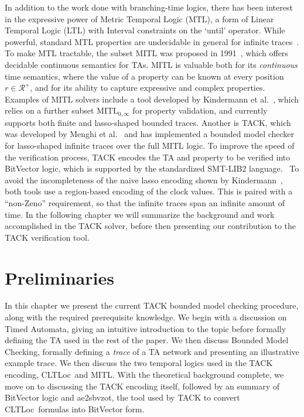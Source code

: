 \documentclass[a4paper,11pt]{report}
\theoremstyle{definition}
\newcommand{\cltloc}{CLTLoc}
\newcommand{\aez}{ae2sbvzot}
\begin{document}
In addition to the work done with branching-time logics, there has been interest
in the expressive power of Metric Temporal Logic (MTL), a form of Linear
Temporal Logic (LTL) with Interval constraints on the `until' operator. While
powerful, standard MTL properties are undecidable in general for infinite
traces~\cite{bouyer09}. To make MTL tractable, the subset MITL was proposed in
1991~\cite{Alur91thebenefits}, which offers decidable continuous semantics for
TAs. MITL is valuable both for its \emph{continuous} time semantics, where the
value of a property can be known at every position $r \in \mathcal{R^{+}}$, and
for its ability to capture expressive and complex properties. Examples of MITL
solvers include a tool developed by Kindermann et al.~\cite{kindermann13}, which
relies on a further subset $\text{MITL}_{0,\infty}$ for property validation, and
currently supports both finite and lasso-shaped bounded traces. Another is TACK,
which was developed by Menghi et al.~\cite{tack20} and has implemented a bounded
model checker for lasso-shaped infinite traces over the full MITL logic. To
improve the speed of the verification process, TACK encodes the TA and property
to be verified into BitVector logic, which is supported by the standardized
SMT-LIB2 language.~\cite{baresi15,baresi16} To avoid the incompleteness of the
naive lasso encoding shown by Kindermann~\cite{kindermann12}, both tools use a
region-based encoding of the clock values. This is paired with a ``non-Zeno''
requirement, so that the infinite traces span an infinite amount of time. In the
following chapter we will summarize the background and work accomplished in the
TACK solver, before then presenting our contribution to the TACK verification
tool.

\chapter{Preliminaries}\label{prelims}

In this chapter we present the current TACK bounded model checking procedure,
along with the required prerequisite knowledge. We begin with a discussion on
Timed Automata, giving an intuitive introduction to the topic before
formally defining the TA used in the rest of the paper. We then discuss Bounded
Model Checking, formally defining a \emph{trace} of a TA network and presenting
an illustrative example trace. We then discuss the two temporal logics used in
the TACK encoding, \cltloc\ and MITL. With the theoretical background complete,
we move on to discussing the TACK encoding itself, followed by an summary of
BitVector logic and \aez, the tool used by TACK to convert \cltloc\ formulas
into BitVector form.
\end{document}
